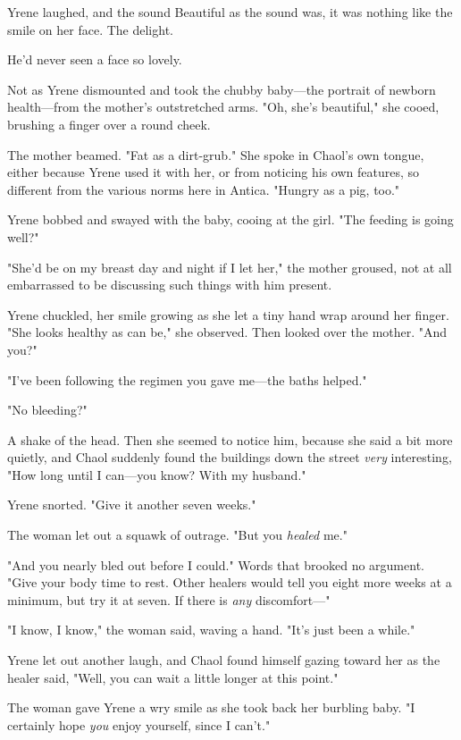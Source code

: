 Yrene laughed, and the sound  Beautiful as the sound was, it was nothing like the smile on her face. The delight.

He'd never seen a face so lovely.

Not as Yrene dismounted and took the chubby baby---the portrait of newborn health---from the mother's outstretched arms. "Oh, she's beautiful," she cooed, brushing a finger over a round cheek.

The mother beamed. "Fat as a dirt-grub." She spoke in Chaol's own tongue, either because Yrene used it with her, or from noticing his own features, so different from the various norms here in Antica. "Hungry as a pig, too."

Yrene bobbed and swayed with the baby, cooing at the girl. "The feeding is going well?"

"She'd be on my breast day and night if I let her," the mother groused, not at all embarrassed to be discussing such things with him present.

Yrene chuckled, her smile growing as she let a tiny hand wrap around her finger. "She looks healthy as can be," she observed. Then looked over the mother. "And you?"

"I've been following the regimen you gave me---the baths helped."

"No bleeding?"

A shake of the head. Then she seemed to notice him, because she said a bit more quietly, and Chaol suddenly found the buildings down the street
\emph{very} interesting, "How long until I can---you know? With my husband."

Yrene snorted. "Give it another seven weeks."

The woman let out a squawk of outrage. "But you \emph{healed} me."

"And you nearly bled out before I could." Words that brooked no argument. "Give your body time to rest. Other healers would tell you eight more weeks at a minimum, but  try it at seven. If there is
\emph{any} discomfort---"

"I know, I know," the woman said, waving a hand. "It's just 
been a while."

Yrene let out another laugh, and Chaol found himself gazing toward her as the healer said, "Well, you can wait a little longer at this point."

The woman gave Yrene a wry smile as she took back her burbling baby. "I certainly hope \emph{you} enjoy yourself, since I can't."

